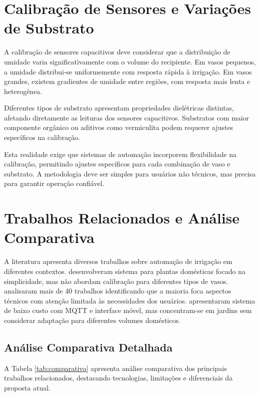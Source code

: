 \documentclass[oneside,english,brazilian]{UNISINOSmonografia}
\begin{document}
\section{Calibração de Sensores e Variações de Substrato}

A calibração de sensores capacitivos deve considerar que a distribuição de umidade varia significativamente com o volume do recipiente. Em vasos pequenos, a umidade distribui-se uniformemente com resposta rápida à irrigação. Em vasos grandes, existem gradientes de umidade entre regiões, com resposta mais lenta e heterogênea.

Diferentes tipos de substrato apresentam propriedades dielétricas distintas, afetando diretamente as leituras dos sensores capacitivos. Substratos com maior componente orgânico ou aditivos como vermiculita podem requerer ajustes específicos na calibração.

Esta realidade exige que sistemas de automação incorporem flexibilidade na calibração, permitindo ajustes específicos para cada combinação de vaso e substrato. A metodologia deve ser simples para usuários não técnicos, mas precisa para garantir operação confiável.

\section{Trabalhos Relacionados e Análise Comparativa}

A literatura apresenta diversos trabalhos sobre automação de irrigação em diferentes contextos.  desenvolveram sistema para plantas domésticas focado na simplicidade, mas não abordam calibração para diferentes tipos de vasos.  analisaram mais de 40 trabalhos identificando que a maioria foca aspectos técnicos com atenção limitada às necessidades dos usuários.  apresentaram sistema de baixo custo com MQTT e interface móvel, mas concentram-se em jardins sem considerar adaptação para diferentes volumes domésticos.

\subsection{Análise Comparativa Detalhada}

A Tabela \ref{tab:comparativo} apresenta análise comparativa dos principais trabalhos relacionados, destacando tecnologias, limitações e diferenciais da proposta atual.
\end{document}
